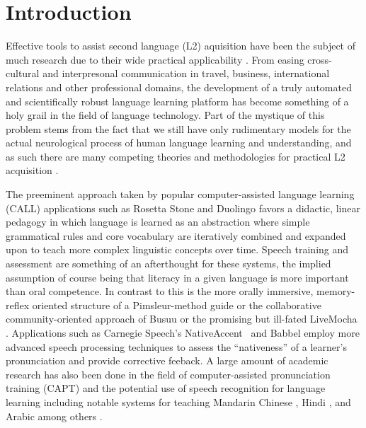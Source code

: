 \section{Introduction}
Effective tools to assist second language (L2) aquisition have been the subject of much research due to their wide practical applicability \cite{higgins1983computer} \cite{levy1997computer} \cite{hubbard2008call}. From easing cross-cultural and interpresonal communication in travel, business, international relations and other professional domains, the development of a truly automated and scientifically robust language learning platform has become something of a holy grail in the field of language technology. Part of the mystique of this problem stems from the fact that we still have only rudimentary models for the actual neurological process of human language learning and understanding, and as such there are many competing theories and methodologies for practical L2 acquisition \cite{pedersenfar} \cite{mitchell2013second}. 

The preeminent approach taken by popular computer-assisted language learning (CALL) applications such as Rosetta Stone \cite{vesselinov2009measuring} and Duolingo \cite{vesselinov2012duolingo} \cite{von2013duolingo} favors a didactic, linear pedagogy in which language is learned as an abstraction where simple grammatical rules and core vocabulary are iteratively combined and expanded upon to teach more complex linguistic concepts over time. Speech training and assessment are something of an afterthought for these systems, the implied assumption of course being that literacy in a given language is more important than oral competence. In contrast to this is the more orally immersive, memory-reflex oriented structure of a Pimsleur-method guide \cite{pimsleur2013learn} \cite{pimsleur1966testing} \cite{pimsleur1971psychology} \cite{godwin2010emerging} or the collaborative community-oriented approach of Busuu \cite{pino2011busuu} \cite{ketyi2013using} or the promising but ill-fated LiveMocha \cite{jee2009livemocha} \cite{liaw2011review}. Applications such as Carnegie Speech's NativeAccent\textregistered \ \cite{eskenazi2007nativeaccenttm} and Babbel employ more advanced speech processing techniques to assess the ``nativeness'' of a learner's pronunciation and provide corrective feeback. A large amount of academic research has also been done in the field of computer-assisted pronunciation training (CAPT) and the potential use of speech recognition for language learning \cite{franco1997automatic} \cite{minematsu2004pronunciation} \cite{van2016evaluating} \cite{mccrocklin2016pronunciation} \cite{leepersonalized} \cite{cincarek2009automatic} \cite{kim1997automatic} \cite{wolfeapplause} including notable systems for teaching Mandarin Chinese \cite{chen2004automatic} \cite{huimproved}, Hindi \cite{patil2016detection}, and Arabic \cite{maqsood2016complete} among others \cite{cucchiarini1997automatic} \cite{bernstein1990automatic}. 

